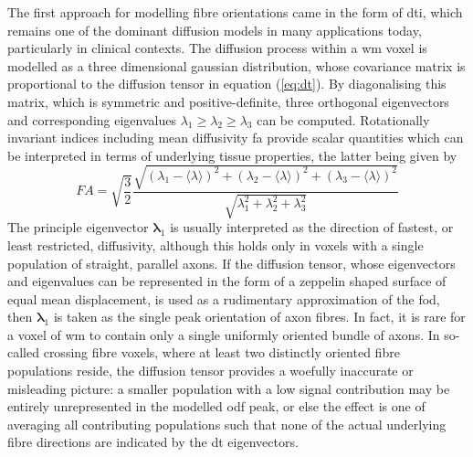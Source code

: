 The first approach for modelling fibre orientations came in the form of \gls{dti}, which remains one of the dominant diffusion models in many applications today, particularly in clinical contexts.
The diffusion process within a \gls{wm} voxel is modelled as a three dimensional gaussian distribution, whose covariance matrix is proportional to the diffusion tensor\autocite{Basser1994,ODonnell2011} in equation (\ref{eq:dt}).
By diagonalising this matrix, which is symmetric and positive-definite, three orthogonal eigenvectors and corresponding eigenvalues $\lambda_1 \geqslant \lambda_2 \geqslant \lambda_3$ can be computed.
Rotationally invariant indices including mean diffusivity \gls{fa} provide scalar quantities which can be interpreted in terms of underlying tissue properties, the latter being given by
\begin{equation}
  FA = \sqrt{\frac{3}{2}}\frac{\sqrt{(\lambda_1 - \langle \lambda \rangle)^2 + (\lambda_2 - \langle \lambda \rangle)^2 + (\lambda_3 - \langle \lambda \rangle)^2}}{\sqrt{\lambda_1^2 + \lambda_2^2+ \lambda_3^2}}
\end{equation}
The principle eigenvector $\bm{\lambda}_1$ is usually interpreted as the direction of fastest, or least restricted, diffusivity, although this holds only in voxels with a single population of straight, parallel axons.
If the diffusion tensor, whose eigenvectors and eigenvalues can be represented in the form of a zeppelin shaped surface of equal mean displacement, is used as a rudimentary approximation of the \gls{fod}, then $\bm{\lambda}_1$ is taken as the single peak orientation of axon fibres.
In fact, it is rare for a voxel of \gls{wm} to contain only a single uniformly oriented bundle of axons.
In so-called crossing fibre voxels, where at least two distinctly oriented fibre populations reside, the diffusion tensor provides a woefully inaccurate or misleading picture: a smaller population with a low signal contribution may be entirely unrepresented in the modelled \gls{odf} peak, or else the effect is one of averaging all contributing populations such that none of the actual underlying fibre directions are indicated by the \gls{dt} eigenvectors.

